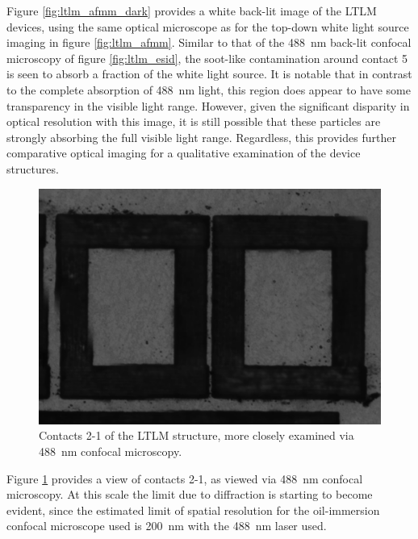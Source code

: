 \begin{refsection}
Figure \ref{fig:ltlm_afmm_dark} provides a white back-lit image of the LTLM devices, using the same optical microscope as for the top-down white light source imaging in figure \ref{fig:ltlm_afmm}. Similar to that of the 488~\si{\nano\metre} back-lit confocal microscopy of figure \ref{fig:ltlm_esid}, the soot-like contamination around contact 5 is seen to absorb a fraction of the white light source. It is notable that in contrast to the complete absorption of 488~\si{\nano\metre} light, this region does appear to have some transparency in the visible light range. However, given the significant disparity in optical resolution with this image, it is still possible that these particles are strongly absorbing the full visible light range. Regardless, this provides further comparative optical imaging for a qualitative examination of the device structures.

\begin{figure}[H]
    \centering
    \includegraphics[width=\linewidth]{Chapter7/Figs/Raster/21_esid.jpg}
    \caption{Contacts 2-1 of the LTLM structure, more closely examined via 488~\si{\nano\metre} confocal microscopy.}
    \label{fig:21_esid}
\end{figure}

Figure \ref{fig:21_esid} provides a view of contacts 2-1, as viewed via 488~\si{\nano\metre} confocal microscopy. At this scale the limit due to diffraction is starting to become evident, since the estimated limit of spatial resolution for the oil-immersion confocal microscope used is 200~\si{\nano\metre} with the 488~\si{\nano\metre} laser used.


\end{refsection}
